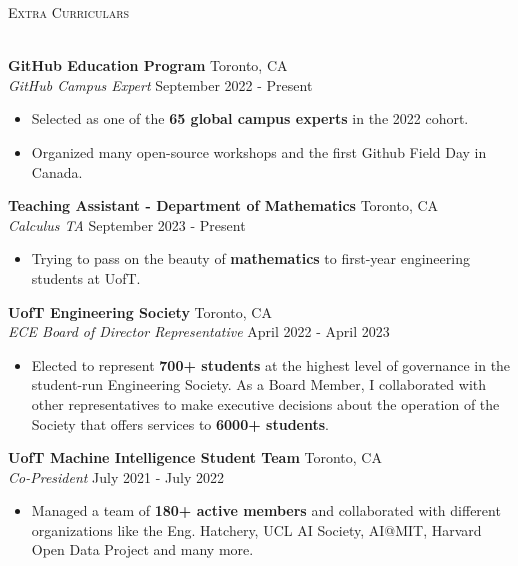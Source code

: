 \documentclass[a4paper]{article}
\newcommand{\lineunder} {
    \vspace*{-8pt} \\
    \hspace*{-18pt} \hrulefill \\
}
\newcommand{\header} [1] {
    {\hspace*{-18pt}\vspace*{6pt} \textsc{#1}}
    \vspace*{-6pt} \lineunder
}
\begin{document}
\header{Extra Curriculars}
\vspace{1mm}

\textbf{GitHub Education Program} \hfill Toronto, CA\\
\textit{GitHub Campus Expert} \hfill September 2022 - Present\\
\vspace{-1mm}
\begin{itemize} \itemsep 0.5pt
	\item Selected as one of the \textbf{65 global campus experts} in the 2022 cohort.
    \item Organized many open-source workshops and the first Github Field Day in Canada.
\end{itemize}

\textbf{Teaching Assistant - Department of Mathematics} \hfill Toronto, CA\\
\textit{Calculus TA} \hfill September 2023 - Present\\
\vspace{-1mm}
\begin{itemize} \itemsep 0.5pt
	\item Trying to pass on the beauty of \textbf{mathematics} to first-year engineering students at UofT.
\end{itemize}

\textbf{UofT Engineering Society} \hfill Toronto, CA\\
\textit{ECE Board of Director Representative} \hfill April 2022 - April 2023\\
\vspace{-1mm}
\begin{itemize} \itemsep 0.5pt
	\item Elected to represent \textbf{700+ students} at the highest level of governance in the student-run Engineering Society. As a Board Member, I collaborated with other representatives to make executive decisions about the operation of the Society that offers services to \textbf{6000+ students}.
\end{itemize}

\textbf{UofT Machine Intelligence Student Team} \hfill Toronto, CA\\
\textit{Co-President} \hfill July 2021 - July 2022\\
\vspace{-1mm}
\begin{itemize} \itemsep 0.5pt
	\item Managed a team of \textbf{180+ active members} and collaborated with different organizations like the Eng. Hatchery, UCL AI Society, AI@MIT, Harvard Open Data Project and many more.
\end{itemize}
\end{document}
